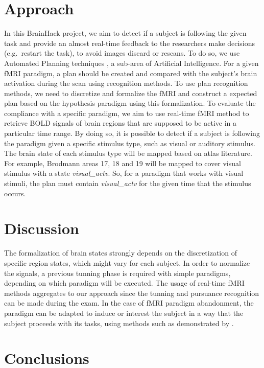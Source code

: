 \documentclass[twocolumn]{bmcart}%
\begin{document}
\section{Approach}\label{approach}

In this BrainHack project, we aim to detect if a subject is following
the given task and provide an almost real-time feedback to the
researchers make decisions (e.g.~restart the task), to avoid images
discard or rescans. To do so, we use Automated Planning techniques
\cite{Sukthankar2014}, a sub-area of Artificial Intelligence. For a
given fMRI paradigm, a plan should be created and compared with the
subject's brain activation during the scan using recognition methods. To
use plan recognition methods, we need to discretize and formalize the
fMRI and construct a expected plan based on the hypothesis paradigm
using this formalization. To evaluate the compliance with a specific
paradigm, we aim to use real-time fMRI method to retrieve BOLD signals
of brain regions that are supposed to be active in a particular time
range. By doing so, it is possible to detect if a subject is following
the paradigm given a specific stimulus type, such as visual or auditory
stimulus. The brain state of each stimulus type will be mapped based on
atlas literature. For example, Brodmann areas 17, 18 and 19 will be
mapped to cover visual stimulus with a state \emph{visual\_actv}. So,
for a paradigm that works with visual stimuli, the plan must contain
\emph{visual\_actv} for the given time that the stimulus occurs.

\section{Discussion}\label{discussion}

The formalization of brain states strongly depends on the discretization
of specific region states, which might vary for each subject. In order
to normalize the signals, a previous tunning phase is required with
simple paradigms, depending on which paradigm will be executed. The
usage of real-time fMRI methods aggregates to our approach since the
tunning and pursuance recognition can be made during the exam. In the
case of fMRI paradigm abandonment, the paradigm can be adapted to induce
or interest the subject in a way that the subject proceeds with its
tasks, using methods such as demonstrated by \cite{Dongha2011}.

\section{Conclusions}\label{conclusions}
\end{document}
